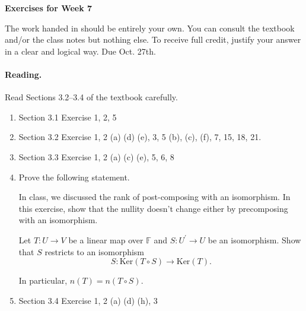 \documentclass[11pt]{article}
\theoremstyle{plain}
\theoremstyle{definition}
\def\F{\mathbb F}
\def\lra{\longrightarrow}
\begin{document}
\begin{center}
{\Large \bf Exercises for Week 7}
\end{center}
The work handed in should be entirely your own. You can consult the textbook and/or the class notes but nothing else. To receive full credit, justify your answer in a clear and logical way. Due Oct. 27th.

\paragraph{Reading.} Read Sections 3.2--3.4 of the textbook carefully.

\begin{enumerate}
\item Section 3.1 Exercise 1, 2, 5
\item Section 3.2 Exercise 1, 2 (a) (d) (e), 3, 5 (b), (c), (f), 7, 15, 18, 21.
\item Section 3.3 Exercise 1, 2 (a) (c) (e), 5, 6, 8
\item Prove the following statement.

In class, we discussed the rank of post-composing with an isomorphism. In this exercise, show that the nullity doesn't change either by precomposing with an isomorphism.

Let $T:U\lra V$ be a linear map over $\F$ and $S:U^\prime \lra U$ be an isomorphism. Show that $S$ restricts to an isomorphism
\[
S: \mathrm{Ker}(T\circ S) \lra \mathrm{Ker}(T).
\]

In particular, $n(T)=n(T\circ S)$.

\item Section 3.4 Exercise 1, 2 (a) (d) (h), 3
\end{enumerate}
\end{document}
